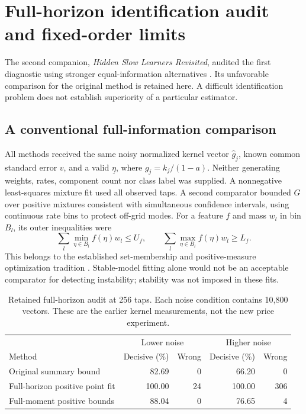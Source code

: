 \documentclass[11pt,a4paper]{article}
\theoremstyle{definition}
\theoremstyle{remark}
\begin{document}
\section{Full-horizon identification audit and fixed-order limits}
\label{sec:integrated_audit}
The second companion, \emph{Hidden Slow Learners Revisited}, audited the first diagnostic using stronger equal-information alternatives \citep{legacy_audit}. Its unfavorable comparison for the original method is retained here. A difficult identification problem does not establish superiority of a particular estimator.

\subsection{A conventional full-information comparison}
All methods received the same noisy normalized kernel vector $\widehat g_j$, known common standard error $v$, and a valid $\underline\eta$, where $g_j=k_j/(1-a)$. Neither generating weights, rates, component count nor class label was supplied. A nonnegative least-squares mixture fit used all observed taps. A second comparator bounded $G$ over positive mixtures consistent with simultaneous confidence intervals, using continuous rate bins to protect off-grid modes. For a feature $f$ and mass $w_l$ in bin $B_l$, its outer inequalities were
\[
 \sum_l \min_{\eta\in B_l} f(\eta)w_l\le U_f,
 \qquad
 \sum_l \max_{\eta\in B_l} f(\eta)w_l\ge L_f.
\]
This belongs to the established set-membership and positive-measure optimization tradition \citep{kosut1992,bertsimas2005}. Stable-model fitting alone would not be an acceptable comparator for detecting instability; stability was not imposed in these fits.

\begin{table}[htbp]
\centering\small
\caption{Retained full-horizon audit at 256 taps. Each noise condition contains 10,800 vectors. These are the earlier kernel measurements, not the new price experiment.}
\label{tab:retained_comparison}
\begin{tabular}{p{}rrrr}\toprule
 & \multicolumn{2}{c}{Lower noise} & \multicolumn{2}{c}{Higher noise}\\
Method & Decisive (\%) & Wrong & Decisive (\%) & Wrong\\\midrule
Original summary bound & 82.69 & 0 & 66.20 & 0\\
Full-horizon positive point fit & 100.00 & 24 & 100.00 & 306\\
Full-moment positive bounds & 88.04 & 0 & 76.65 & 4\\\bottomrule
\end{tabular}
\end{table}
\end{document}
